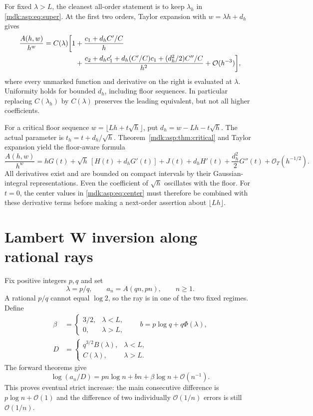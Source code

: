 \documentclass[11pt,letterpaper]{article}
\numberwithin{equation}{section}
\theoremstyle{remark}\newtheorem{remark}[theorem]{Remark}
\newcommand{\Oh}{\mathcal O}\newcommand{\Q}{\mathbb Q}\newcommand{\N}{\mathbb N}\newcommand{\R}{\mathbb R}
\begin{document}
For fixed $\lambda>L$, the cleanest all-order statement is to keep $\lambda_h$ in \eqref{mdk:asp:eq:super}. At the first two orders, Taylor expansion with $w=\lambda h+d_h$ gives
\begin{align}\label{mdk:asp:eq:superfloor}
\frac{A(h,w)}{h^w}
=C(\lambda)\biggl[1&+\frac{c_1+d_hC'/C}{h}\notag\\
&+\frac{c_2+d_hc_1'+d_h(C'/C)c_1+(d_h^2/2)C''/C}{h^2}
+\Oh(h^{-3})\biggr],
\end{align}
where every unmarked function and derivative on the right is evaluated at $\lambda$. Uniformity holds for bounded $d_h$, including floor sequences. In particular replacing $C(\lambda_h)$ by $C(\lambda)$ preserves the leading equivalent, but not all higher coefficients.

For a critical floor sequence $w=\lfloor Lh+t\sqrt h\rfloor$, put $d_h=w-Lh-t\sqrt h$. The actual parameter is $t_h=t+d_h/\sqrt h$. Theorem~\ref{mdk:asp:thm:critical} and Taylor expansion yield the floor-aware formula
\begin{equation}\label{mdk:asp:eq:criticalfloor}
\frac{A(h,w)}{h^w}
=hG(t)+\sqrt h\,[H(t)+d_hG'(t)]
+J(t)+d_hH'(t)+\frac{d_h^2}{2}G''(t)+\Oh_T(h^{-1/2}).
\end{equation}
All derivatives exist and are bounded on compact intervals by their Gaussian-integral representations. Even the coefficient of $\sqrt h$ oscillates with the floor. For $t=0$, the center values in \eqref{mdk:asp:eq:center} must therefore be combined with these derivative terms before making a next-order assertion about $\lfloor Lh\rfloor$.

\section{Lambert W inversion along rational rays}\label{mdk:asp:sec:inverse}
Fix positive integers $p,q$ and set
\[
\lambda=p/q,\qquad a_n=A(qn,pn),\qquad n\ge1.
\]
A rational $p/q$ cannot equal $\log2$, so the ray is in one of the two fixed regimes. Define
\begin{equation}\label{mdk:asp:eq:inversedata}
\begin{split}
\beta&=\begin{cases}3/2,&\lambda<L,\\0,&\lambda>L,\end{cases}
\qquad b=p\log q+q\Phi(\lambda),\\
D&=\begin{cases}q^{3/2}B(\lambda),&\lambda<L,\\C(\lambda),&\lambda>L.
\end{cases}
\end{split}
\end{equation}
The forward theorems give
\begin{equation}\label{mdk:asp:eq:logray}
\log(a_n/D)=pn\log n+bn+\beta\log n+\Oh(n^{-1}).
\end{equation}
This proves eventual strict increase: the main consecutive difference is $p\log n+\Oh(1)$ and the difference of two individually $\Oh(1/n)$ errors is still $\Oh(1/n)$.
\end{document}

